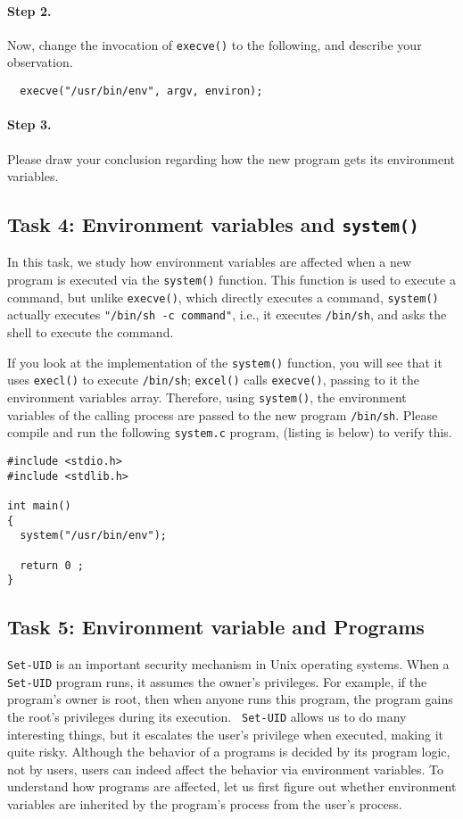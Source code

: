 \paragraph{Step 2.} Now, change the invocation of {\tt execve()} to the following, and 
describe your observation.
\begin{verbatim}
  execve("/usr/bin/env", argv, environ);
\end{verbatim}


\paragraph{Step 3.} Please draw your conclusion regarding how the new
program gets its environment variables. 


\subsection{Task 4: Environment variables and {\tt system()}}

In this task, we study how environment variables are affected 
when a new program is executed via the {\tt system()} function. This 
function is used to execute a command, but unlike
{\tt execve()}, which directly executes a command, {\tt system()}
actually executes {\tt "/bin/sh -c command"}, i.e., it
executes {\tt /bin/sh}, and asks the shell to execute the command.

If you look at the implementation of the {\tt system()} function, you will
see that it uses {\tt execl()} to execute {\tt /bin/sh}; {\tt excel()}
calls {\tt execve()}, passing to it the environment variables array. 
Therefore, using {\tt system()},  the environment variables of the calling process 
are passed to the new program {\tt /bin/sh}. Please compile and run the following 
{\tt system.c} program, (listing is below) to verify this. 


\begin{Verbatim}[frame=single]
#include <stdio.h>
#include <stdlib.h>

int main()
{
  system("/usr/bin/env");

  return 0 ;
}
\end{Verbatim}


\subsection{Task 5: Environment variable and \setuid Programs}

{\tt Set-UID} is an important security mechanism in Unix operating systems.
When a {\tt Set-UID} program runs, it assumes the owner's privileges. For
example, if the program's owner is root, then when anyone runs this
program, the program gains the root's privileges during its execution. {\tt
Set-UID} allows us to do many interesting things, but it escalates the
user's privilege when executed, making it quite risky. Although the
behavior of a \setuid programs is decided by its program logic, not by
users, users can indeed affect the behavior via environment variables. 
To understand how \setuid programs are affected, let us first figure out
whether environment variables are inherited by the \setuid program's
process from the user's process.


